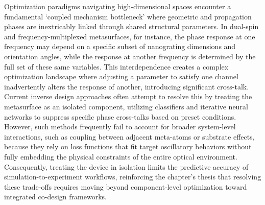 Optimization paradigms navigating high-dimensional spaces encounter a fundamental `coupled mechanism bottleneck' where geometric and propagation phases are inextricably linked through shared structural parameters. In dual-spin and frequency-multiplexed metasurfaces, for instance, the phase response at one frequency may depend on a specific subset of nanograting dimensions and orientation angles, while the response at another frequency is determined by the full set of these same variables. \citep{doi_10_1117_1_apn_2_1_016010_57069347} \citep{doi_10_1002_advs_202504634_52bafb6c} This interdependence creates a complex optimization landscape where adjusting a parameter to satisfy one channel inadvertently alters the response of another, introducing significant cross-talk. Current inverse design approaches often attempt to resolve this by treating the metasurface as an isolated component, utilizing classifiers and iterative neural networks to suppress specific phase cross-talks based on preset conditions. However, such methods frequently fail to account for broader system-level interactions, such as coupling between adjacent meta-atoms or substrate effects, because they rely on loss functions that fit target oscillatory behaviors without fully embedding the physical constraints of the entire optical environment. Consequently, treating the device in isolation limits the predictive accuracy of simulation-to-experiment workflows, reinforcing the chapter's thesis that resolving these trade-offs requires moving beyond component-level optimization toward integrated co-design frameworks. \citep{doi_10_1117_1_apn_2_1_016010_57069347} \citep{doi_10_1515_nanoph_2020_0379_1cc596ab}

